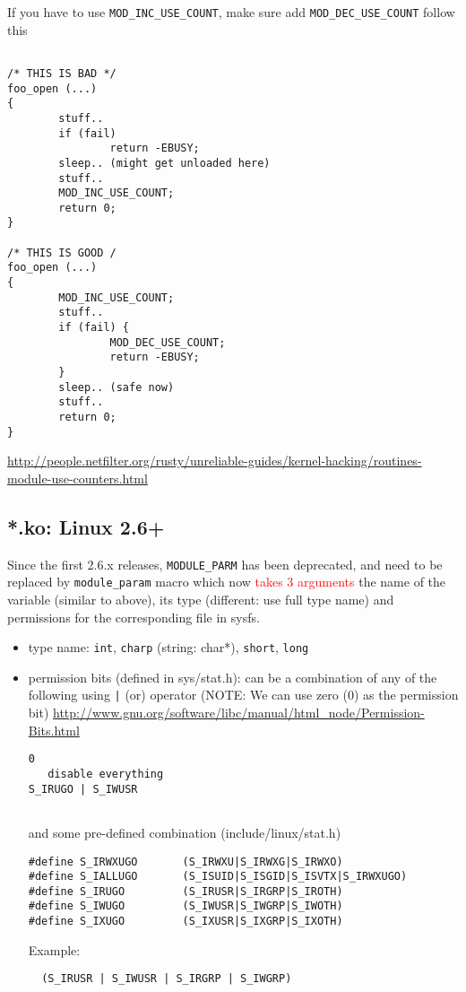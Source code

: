 If you have to use \verb!MOD_INC_USE_COUNT!, make sure add
\verb!MOD_DEC_USE_COUNT! follow this
\begin{verbatim}

/* THIS IS BAD */
foo_open (...)
{
        stuff..
        if (fail)
                return -EBUSY;
        sleep.. (might get unloaded here)
        stuff..
        MOD_INC_USE_COUNT;
        return 0;
}

/* THIS IS GOOD /
foo_open (...)
{
        MOD_INC_USE_COUNT;
        stuff..
        if (fail) {
                MOD_DEC_USE_COUNT;
                return -EBUSY;
        }
        sleep.. (safe now)
        stuff..
        return 0;
}
\end{verbatim}
\url{http://people.netfilter.org/rusty/unreliable-guides/kernel-hacking/routines-module-use-counters.html}



\subsection{*.ko: Linux 2.6+}
\label{sec:module_Linux-2.6.x}

Since the first 2.6.x releases, \verb!MODULE_PARM! has been deprecated, and need
to be replaced by \verb!module_param! macro which now \textcolor{red}{takes 3 arguments}
the name of the variable (similar to above), its type (different: use
full type name) and permissions for the corresponding file in sysfs.
\begin{itemize}
  \item type name: \verb!int!, \verb!charp! (string: char*), \verb!short!,
  \verb!long!
   
  \item permission bits (defined in sys/stat.h): can be a combination of any of
  the following using \verb!|! (or) operator (NOTE: We can use zero (0) as the permission bit)
  \url{http://www.gnu.org/software/libc/manual/html_node/Permission-Bits.html}
\begin{verbatim}
0  
   disable everything
S_IRUGO | S_IWUSR
      
\end{verbatim}
and some pre-defined combination (include/linux/stat.h)
\begin{verbatim}
#define S_IRWXUGO       (S_IRWXU|S_IRWXG|S_IRWXO)
#define S_IALLUGO       (S_ISUID|S_ISGID|S_ISVTX|S_IRWXUGO)
#define S_IRUGO         (S_IRUSR|S_IRGRP|S_IROTH)
#define S_IWUGO         (S_IWUSR|S_IWGRP|S_IWOTH)
#define S_IXUGO         (S_IXUSR|S_IXGRP|S_IXOTH)
\end{verbatim}  
  
  Example:
  \begin{verbatim}
  (S_IRUSR | S_IWUSR | S_IRGRP | S_IWGRP)
  \end{verbatim}
\end{itemize}

